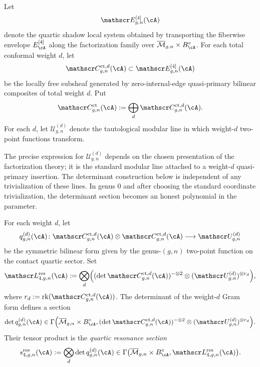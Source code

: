 \begin{definition}
\label{def:nms-contact-quartic-bundle}
Let
\[
\mathscr E_{g,n}^{[4]}(\cA)
\]
denote the quartic shadow local system obtained by transporting the fiberwise envelope $E_{\cA}^{[4]}$ along the factorization family over $\overline{\mathcal M}_{g,n}\times B_{\cA}^{\circ}$. For each total conformal weight $d$, let
\[
\mathscr C_{g,n}^{\mathrm{ct},d}(\cA)
\subset
\mathscr E_{g,n}^{[4]}(\cA)
\]
be the locally free subsheaf generated by zero-internal-edge quasi-primary bilinear composites of total weight $d$. Put
\[
\mathscr C_{g,n}^{\mathrm{ct}}(\cA):=\bigoplus_d \mathscr C_{g,n}^{\mathrm{ct},d}(\cA).
\]
For each $d$, let $\mathscr U_{g,n}^{(d)}$ denote the tautological modular line in which weight-$d$ two-point functions transform.
\end{definition}

\begin{remark}
\label{rem:nms-tautological-lines}
The precise expression for $\mathscr U_{g,n}^{(d)}$ depends on the chosen presentation of the factorization theory; it is the standard modular line attached to a weight-$d$ quasi-primary insertion. The determinant construction below is independent of any trivialization of these lines. In genus $0$ and after choosing the standard coordinate trivialization, the determinant section becomes an honest polynomial in the parameter.
\end{remark}

\begin{construction}
\label{constr:nms-gram-determinant-line}
For each weight $d$, let
\[
q_{g,n}^{(d)}(\cA)
\colon
\mathscr C_{g,n}^{\mathrm{ct},d}(\cA)\otimes
\mathscr C_{g,n}^{\mathrm{ct},d}(\cA)
\longrightarrow
\mathscr U_{g,n}^{(d)}
\]
be the symmetric bilinear form given by the genus-$(g,n)$ two-point function on the contact quartic sector. Set
\begin{equation}
\label{eq:nms-resonance-line}
\mathscr L_{4,g,n}^{\mathrm{res}}(\cA)
:=
\bigotimes_d
\Bigl(
(\det \mathscr C_{g,n}^{\mathrm{ct},d}(\cA))^{-\otimes 2}
\otimes
(\mathscr U_{g,n}^{(d)})^{\otimes r_d}
\Bigr),
\end{equation}
where $r_d:=\operatorname{rk}(\mathscr C_{g,n}^{\mathrm{ct},d}(\cA))$. The determinant of the weight-$d$ Gram form defines a section
\[
\det q_{g,n}^{(d)}(\cA)
\in
\Gamma\Bigl(\overline{\mathcal M}_{g,n}\times B_{\cA}^{\circ},
(\det \mathscr C_{g,n}^{\mathrm{ct},d}(\cA))^{-\otimes 2}
\otimes
(\mathscr U_{g,n}^{(d)})^{\otimes r_d}
\Bigr).
\]
Their tensor product is the \emph{quartic resonance section}
\begin{equation}
\label{eq:nms-resonance-section}
s_{4,g,n}^{\mathrm{res}}(\cA)
:=
\bigotimes_d \det q_{g,n}^{(d)}(\cA)
\in \Gamma\bigl(\overline{\mathcal M}_{g,n}\times B_{\cA}^{\circ},
\mathscr L_{4,g,n}^{\mathrm{res}}(\cA)\bigr).
\end{equation}
\end{construction}

